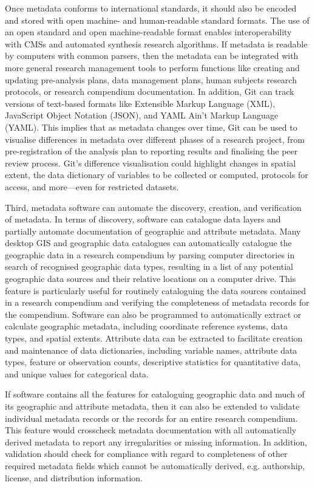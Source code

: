 \documentclass{isprs} %
\begin{document}
Once metadata conforms to international standards, it should also be encoded and stored with open machine- and human-readable standard formats. 
The use of an open standard and open machine-readable format enables interoperability with CMSs and automated synthesis research algorithms.
If metadata is readable by computers with common parsers, then the metadata can be integrated with more general research management tools to perform functions like creating and updating pre-analysis plans, data management plans, human subjects research protocols, or research compendium documentation.
In addition, Git can track versions of text-based formats like Extensible Markup Language (XML), JavaScript Object Notation (JSON), and YAML Ain't Markup Language (YAML).
This implies that as metadata changes over time, Git can be used to visualise differences in metadata over different phases of a research project, from pre-registration of the analysis plan to reporting results and finalising the peer review process.
Git's difference visualisation could highlight changes in spatial extent, the data dictionary of variables to be collected or computed, protocols for access, and more---even for restricted datasets.

Third, metadata software can automate the discovery, creation, and verification of metadata.
In terms of discovery, software can catalogue data layers and partially automate documentation of geographic and attribute metadata.
Many desktop GIS and geographic data catalogues can automatically catalogue the geographic data in a research compendium by parsing computer directories in search of recognised geographic data types, resulting in a list of any potential geographic data sources and their relative locations on a computer drive.
This feature is particularly useful for routinely cataloguing the data sources contained in a research compendium and verifying the completeness of metadata records for the compendium.
Software can also be programmed to automatically extract or calculate geographic metadata, including coordinate reference systems, data types, and spatial extents.
Attribute data can be extracted to facilitate creation and maintenance of data dictionaries, including variable names, attribute data types, feature or observation counts, descriptive statistics for quantitative data, and unique values for categorical data.

If software contains all the features for cataloguing geographic data and much of its geographic and attribute metadata, then it can also be extended to validate individual metadata records or the records for an entire research compendium.
This feature would crosscheck metadata documentation with all automatically derived metadata to report any irregularities or missing information.
In addition, validation should check for compliance with regard to completeness of other required metadata fields which cannot be automatically derived, e.g. authorship, license, and distribution information.
\end{document}

